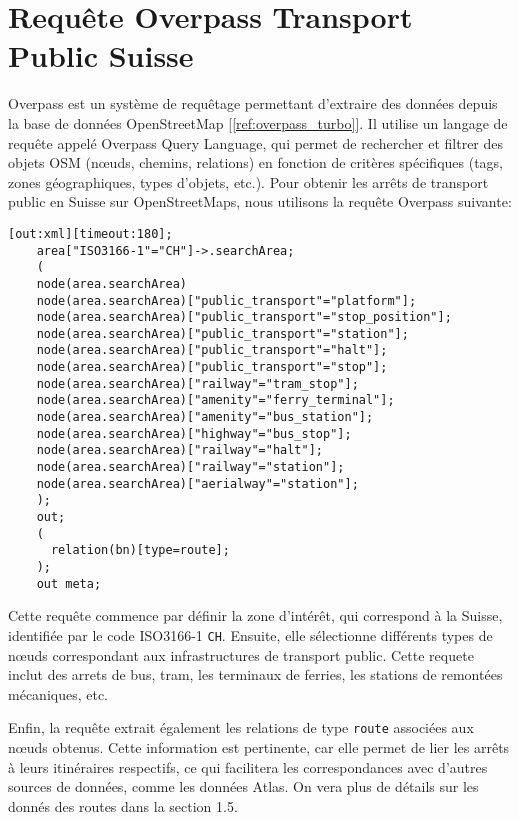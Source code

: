 \section{Requête Overpass Transport Public Suisse}
Overpass est un système de requêtage permettant d'extraire des données depuis la base de données OpenStreetMap [\ref{ref:overpass_turbo}]. Il utilise un langage de requête appelé Overpass Query Language, qui permet de rechercher et filtrer des objets OSM (nœuds, chemins, relations) en fonction de critères spécifiques (tags, zones géographiques, types d'objets, etc.).
Pour obtenir les arrêts de transport public en Suisse sur OpenStreetMaps, nous utilisons la requête Overpass suivante:

\begin{tcolorbox}[colback=gray!10, colframe=brown, title=Requête Overpass]
\begin{verbatim}
[out:xml][timeout:180];
    area["ISO3166-1"="CH"]->.searchArea;
    (
    node(area.searchArea)
    node(area.searchArea)["public_transport"="platform"];
    node(area.searchArea)["public_transport"="stop_position"];
    node(area.searchArea)["public_transport"="station"];
    node(area.searchArea)["public_transport"="halt"];
    node(area.searchArea)["public_transport"="stop"];
    node(area.searchArea)["railway"="tram_stop"];
    node(area.searchArea)["amenity"="ferry_terminal"];
    node(area.searchArea)["amenity"="bus_station"];
    node(area.searchArea)["highway"="bus_stop"];
    node(area.searchArea)["railway"="halt"];
    node(area.searchArea)["railway"="station"];
    node(area.searchArea)["aerialway"="station"];
    );
    out;
    (
      relation(bn)[type=route];
    );
    out meta;
\end{verbatim}
\end{tcolorbox}

Cette requête commence par définir la zone d'intérêt, qui correspond à la Suisse, identifiée par le code ISO3166-1 \texttt{CH}. Ensuite, elle sélectionne différents types de nœuds correspondant aux infrastructures de transport public. Cette requete inclut des arrets de bus, tram, les terminaux de ferries, les stations de remontées mécaniques, etc.


Enfin, la requête extrait également les relations de type \texttt{route} associées aux nœuds obtenus. Cette information est pertinente, car elle permet de lier les arrêts à leurs itinéraires respectifs, ce qui facilitera les correspondances avec d'autres sources de données, comme les données Atlas. On vera plus de détails sur les donnés des routes dans la section 1.5.

